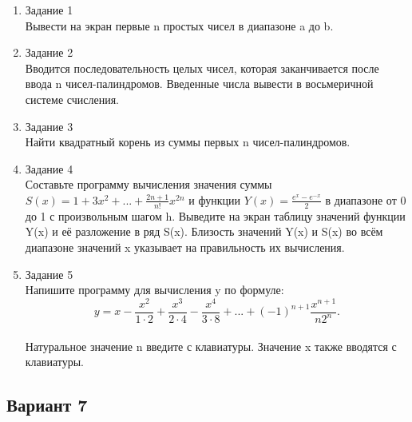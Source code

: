 \documentclass[a4paper]{article}
\begin{document}
	\begin{enumerate} 
		\item Задание 1 \\
			Вывести на экран первые n простых чисел в диапазоне a до b.\\
		\item Задание 2\\
			Вводится последовательность целых чисел, которая заканчивается после ввода n чисел-палиндромов.  
			Введенные числа вывести в восьмеричной системе счисления.\\
		\item Задание 3 \\
			Найти квадратный корень из суммы первых  n чисел-палиндромов.\\
		\item Задание 4 \\
			Составьте программу вычисления значения суммы  $S(x)=1+3x^2+...+\frac{2n+1}{n!}x^{2n}$
			и функции $Y(x)=\frac{e^x-e^{-x}}{2}$ в диапазоне от 0 до 1
			с произвольным шагом h. Выведите на экран таблицу значений функции Y(x) и её разложение в ряд S(x). Близость значений Y(x) и S(x) во всём диапазоне
			значений x указывает на правильность их вычисления.\\
		\item Задание 5 \\
			Напишите программу для вычисления y по формуле:\\
			$$y=x-\frac{x^2}{1\cdot2}+\frac{x^3}{2\cdot4}-\frac{x^4}{3\cdot8}+...+(-1)^{n+1}\frac{x^{n+1}}{n2^n}.$$\\
			Натуральное значение n введите с клавиатуры. Значение x также вводятся с клавиатуры.\\
	\end{enumerate}
	
	\begin{center}
		\subsection*{Вариант 7}
	\end{center}
\end{document}
